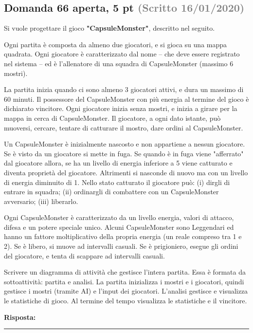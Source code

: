 \documentclass[a4paper,11pt]{article}
\begin{document}
\subsection*{Domanda 66 \hfill {\small aperta, 5 pt \textcolor{gray}{(Scritto 16/01/2020)}}}
\begin{tcolorbox}[colback=gray!8,colframe=gray!50,title=Contesto]
Si vuole progettare il gioco \textbf{"CapsuleMonster"}, descritto nel seguito.

Ogni partita è composta da almeno due giocatori, e si gioca su una mappa quadrata. Ogni giocatore è caratterizzato dal nome – che deve essere registrato nel sistema – ed è l'allenatore di una squadra di CapsuleMonster (massimo 6 mostri).

La partita inizia quando ci sono almeno 3 giocatori attivi, e dura un massimo di 60 minuti. Il possessore del CapsuleMonster con più energia al termine del gioco è dichiarato vincitore. Ogni giocatore inizia senza mostri, e inizia a girare per la mappa in cerca di CapsuleMonster. Il giocatore, a ogni dato istante, può muoversi, cercare, tentare di catturare il mostro, dare ordini al CapsuleMonster.

Un CapsuleMonster è inizialmente nascosto e non appartiene a nessun giocatore. Se è visto da un giocatore si mette in fuga. Se quando è in fuga viene "afferrato" dal giocatore allora, se ha un livello di energia inferiore a 5 viene catturato e diventa proprietà del giocatore. Altrimenti si nasconde di nuovo ma con un livello di energia diminuito di 1. Nello stato catturato il giocatore può: (i) dirgli di entrare in squadra; (ii) ordinargli di combattere con un CapsuleMonster avversario; (iii) liberarlo.

Ogni CapsuleMonster è caratterizzato da un livello energia, valori di attacco, difesa e un potere speciale unico. Alcuni CapsuleMonster sono Leggendari ed hanno un fattore moltiplicativo della propria energia (un reale compreso tra 1 e 2). Se è libero, si muove ad intervalli casuali. Se è prigioniero, esegue gli ordini del giocatore, e tenta di scappare ad intervalli casuali.
\end{tcolorbox}
Scrivere un diagramma di attività che gestisce l'intera partita. Essa è formata da sottoattività: partita e analisi. La partita inizializza i mostri e i giocatori, quindi gestisce i mostri (tramite AI) e l'input dei giocatori. L'analisi gestisce e visualizza le statistiche di gioco. Al termine del tempo visualizza le statistiche e il vincitore.

\vspace{0.2cm}
\noindent\textbf{Risposta:}\par
\vspace{4cm}\hrule
\end{document}
